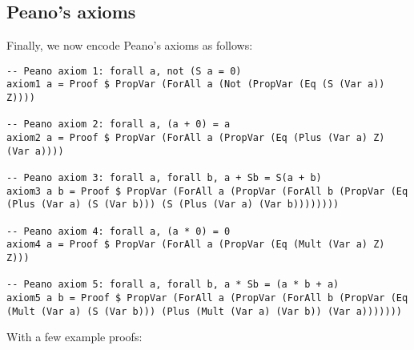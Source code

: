 \documentclass{article}
\begin{document}
\subsection{Peano's axioms}

Finally, we now encode Peano's axioms as follows:

\begin{lstlisting}
-- Peano axiom 1: forall a, not (S a = 0)
axiom1 a = Proof $ PropVar (ForAll a (Not (PropVar (Eq (S (Var a)) Z))))

-- Peano axiom 2: forall a, (a + 0) = a
axiom2 a = Proof $ PropVar (ForAll a (PropVar (Eq (Plus (Var a) Z) (Var a))))

-- Peano axiom 3: forall a, forall b, a + Sb = S(a + b)
axiom3 a b = Proof $ PropVar (ForAll a (PropVar (ForAll b (PropVar (Eq (Plus (Var a) (S (Var b))) (S (Plus (Var a) (Var b))))))))

-- Peano axiom 4: forall a, (a * 0) = 0
axiom4 a = Proof $ PropVar (ForAll a (PropVar (Eq (Mult (Var a) Z) Z)))

-- Peano axiom 5: forall a, forall b, a * Sb = (a * b + a)
axiom5 a b = Proof $ PropVar (ForAll a (PropVar (ForAll b (PropVar (Eq (Mult (Var a) (S (Var b))) (Plus (Mult (Var a) (Var b)) (Var a)))))))
\end{lstlisting}

With a few example proofs:
\end{document}

